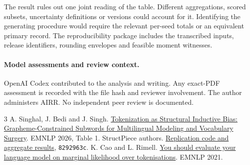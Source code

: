 \documentclass[11pt]{article}
\begin{document}
The result rules out one joint reading of the table. Different aggregations, scored subsets, uncertainty definitions or versions could account for it. Identifying the generating procedure would require the relevant per-seed totals or an equivalent primary record. The reproducibility package includes the transcribed inputs, release identifiers, rounding envelopes and feasible moment witnesses.

\paragraph{Model assessments and review context.} OpenAI Codex contributed to the analysis and writing. Any exact-PDF assessment is recorded with the file hash and reviewer involvement. The author administers AIRR. No independent peer review is documented.

\small\begin{thebibliography}{3}
 A. Singhal, J. Bedi and J. Singh. \href{https://aclanthology.org/2026.emnlp-main.972/}{Tokenization as Structural Inductive Bias: Grapheme-Constrained Subwords for Multilingual Modeling and Vocabulary Surgery}. EMNLP 2026, Table 1.
 StructPiece authors. \href{https://github.com/submissionemnlp26-beep/structpiece-code/blob/8292963c3998f46ea6b7bb2a6df62319685b436e/reproduce/generate_tables.py}{Replication code and aggregate results}, \texttt{8292963c}.
 K. Cao and L. Rimell. \href{https://aclanthology.org/2021.emnlp-main.161/}{You should evaluate your language model on marginal likelihood over tokenisations}. EMNLP 2021.
\end{thebibliography}
\end{document}
